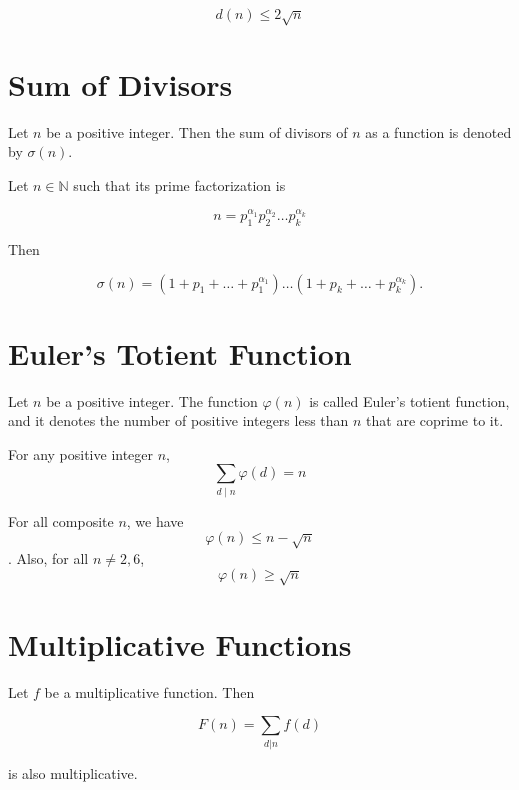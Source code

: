 \begin{theorem}
    \[d(n) \leq 2 \sqrt n\]
\end{theorem}

\section{Sum of Divisors}

\begin{definition}
Let $n$ be a positive integer. Then the sum of divisors of $n$ as a function
is denoted by $\sigma(n)$.    
\end{definition}

\begin{theorem} Let $n \in \mathbb{N}$ such that its prime factorization is

    \[n = p_1^{\alpha_1} p_2^{\alpha_2} \dots p_k^{\alpha_k}\]

Then

    \[\sigma(n) = (1 + p_1+\dots+ p_1^{\alpha_1}) \dots (1 + p_k+\dots+p_k ^{\alpha_k}).\]
    
\end{theorem}


\section{Euler's Totient Function}

\begin{definition}
    Let $n$ be a positive integer. The function $\varphi(n)$ is called Euler's totient function, and it denotes the number of positive integers less than $n$ that are coprime to it.
\end{definition}

\begin{theorem}[Gauss] For any positive integer $n$,
    \[\sum_{d\mid n} \varphi(d) = n\]
\end{theorem}

\begin{lemma}
    For all composite $n$, we have
    \[\varphi(n) \leq n-\sqrt{n}\].
    Also, for all $n \neq 2, 6$, 
    \[\varphi(n) \geq \sqrt{n}\]
\end{lemma}

\section{Multiplicative Functions}

\begin{theorem}
    Let $f$ be a multiplicative function. Then 

    \[F(n) = \sum_{d|n} f(d)\]

    is also multiplicative.
\end{theorem}

